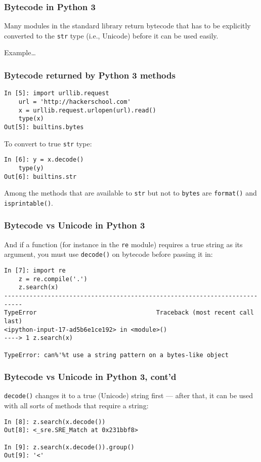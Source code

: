 \documentclass{beamer}
\begin{document}
\begin{frame}[fragile]
  \frametitle{Bytecode in Python 3}
Many modules in the standard library return bytecode that has to be explicitly converted to the \texttt{str} type (i.e., Unicode) before it can be used easily.

\vskip24pt

Example\dots

\end{frame}


\begin{frame}[fragile]
  \frametitle{Bytecode returned by Python 3 methods}
   \begin{lstlisting}
In [5]: import urllib.request
    url = 'http://hackerschool.com'
    x = urllib.request.urlopen(url).read()
    type(x)
Out[5]: builtins.bytes
\end{lstlisting}

To convert to true \texttt{str} type:
\begin{lstlisting}
In [6]: y = x.decode()
    type(y)
Out[6]: builtins.str
\end{lstlisting}

\vskip12pt Among the methods that are available to \texttt{str} but not to \texttt{bytes} are \texttt{format()} and \texttt{isprintable()}. 

\end{frame}


\begin{frame}[fragile]
  \frametitle{Bytecode vs Unicode in Python 3}
And if a function (for instance in the \texttt{re} module) requires a true string as its argument, you must use \texttt{decode()} on bytecode before passing it in:

\vskip12pt\begin{lstlisting}[escapechar=\%]
In [7]: import re
    z = re.compile('.')
    z.search(x)
---------------------------------------------------------------------------
TypeError                                 Traceback (most recent call last)
<ipython-input-17-ad5b6e1ce192> in <module>()
----> 1 z.search(x)

TypeError: can%'%t use a string pattern on a bytes-like object
\end{lstlisting}

\end{frame}


\begin{frame}[fragile]
  \frametitle{Bytecode vs Unicode in Python 3, cont'd}
\texttt{decode()} changes it to a true (Unicode) string first --- after that, it can be used with all sorts of methods that require a string:\vskip12pt\begin{lstlisting}
In [8]: z.search(x.decode())
Out[8]: <_sre.SRE_Match at 0x231bbf8>

In [9]: z.search(x.decode()).group()
Out[9]: '<'
\end{lstlisting}

\end{frame}
\end{document}
